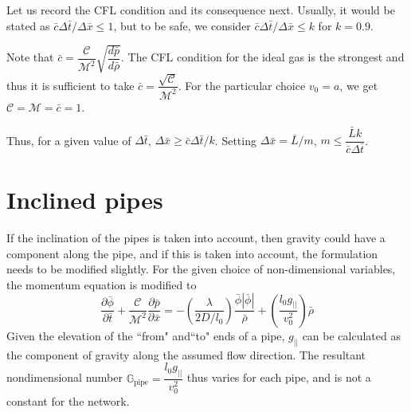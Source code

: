 \documentclass{amsart}
\begin{document}
Let us record the CFL condition and its consequence next. Usually, it would be stated as $\bar{c}\Delta \bar{t}/ \Delta \bar{x} \leq 1$, but to be safe, we consider 
$\bar{c}\Delta \bar{t}/ \Delta \bar{x} \leq k$ for $k= 0.9$.

Note that $\bar{c} = \dfrac{\mathcal{C}}{\mathcal{M}^2} \sqrt{\dfrac{d \bar{p}}{d \bar{\rho}}}$.
The CFL condition for the ideal gas is the strongest and thus it is sufficient to take $\bar{c} = \dfrac{\sqrt{\mathcal{C}}}{\mathcal{M}^2}$. For the particular choice $v_0 = a$, we  get $\mathcal{C} = \mathcal{M} = \bar{c} = 1$.

Thus, for a given value of $\Delta \bar{t}$, $\Delta \bar{x} \geq \bar{c}\Delta \bar{t}/k$. Setting $\Delta \bar{x} = \bar{L}/m$,  $m \leq \dfrac{\bar{L} k}{\bar{c}\Delta \bar{t}}$.


\section{Inclined pipes}
If the inclination of the pipes is taken into account, then gravity could have a component along the pipe, and if this is taken into account, the formulation needs to be modified slightly.
For the given choice of non-dimensional variables, the momentum equation is modified to
$$\dfrac{\partial \bar{\phi}}{\partial \bar{t}} + \dfrac{\mathcal{C}}{\mathcal{M}^2}\dfrac{\partial \bar{p}}{\partial \bar{x}} = -\left( \dfrac{\lambda}{2D/l_0} \right) \dfrac{\bar{\phi}|\bar{\phi}|}{\bar{\rho}} + 
\left ( \dfrac{l_0g_{||}}{v_0^2} \right )\bar{\rho}$$
Given the elevation of the ``from" and``to" ends of a pipe, $g_{||}$ can be calculated as the component of gravity along the assumed flow direction. The resultant nondimensional number $\mathbb{G}_{\mathrm{pipe}} = \dfrac{l_0 g_{||}}{v_0^2}$ thus varies for each pipe, and is not a constant for the network.
\end{document}
